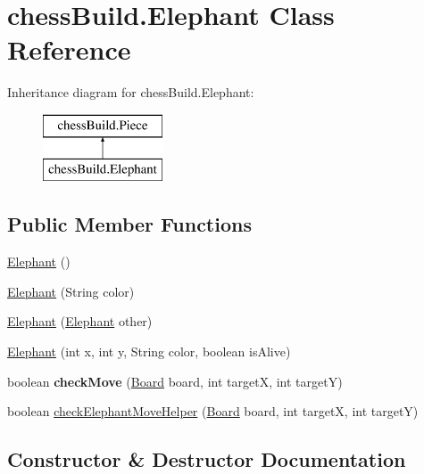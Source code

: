\hypertarget{classchess_build_1_1_elephant}{}\section{chess\+Build.\+Elephant Class Reference}
\label{classchess_build_1_1_elephant}
Inheritance diagram for chess\+Build.\+Elephant\+:\begin{figure}[H]
\begin{center}
\leavevmode
\includegraphics[height=2.000000cm]{classchess_build_1_1_elephant}
\end{center}
\end{figure}
\subsection*{Public Member Functions}
\begin{DoxyCompactItemize}
\item 
\hyperlink{classchess_build_1_1_elephant_a10ef050e05cb57bace154ff12752115b}{Elephant} ()
\item 
\hyperlink{classchess_build_1_1_elephant_ac60142f5a3931dbbf71ecc65358d43a3}{Elephant} (String color)
\item 
\hyperlink{classchess_build_1_1_elephant_a0323849e4a8078589161ab4d684f56ce}{Elephant} (\hyperlink{classchess_build_1_1_elephant}{Elephant} other)
\item 
\hyperlink{classchess_build_1_1_elephant_ad32f3bcb8f925d0d0a0e26285b2009f3}{Elephant} (int x, int y, String color, boolean is\+Alive)
\item 
\mbox{\label{classchess_build_1_1_elephant_a576a8241d17268a8d070b41d96f15832}} 
boolean {\bfseries check\+Move} (\hyperlink{classchess_build_1_1_board}{Board} board, int targetX, int targetY)
\item 
boolean \hyperlink{classchess_build_1_1_elephant_a2385d9354fdc457beee06e59f2da8464}{check\+Elephant\+Move\+Helper} (\hyperlink{classchess_build_1_1_board}{Board} board, int targetX, int targetY)
\end{DoxyCompactItemize}


\subsection{Constructor \& Destructor Documentation}
\mbox{\label{classchess_build_1_1_elephant_a10ef050e05cb57bace154ff12752115b}} 
